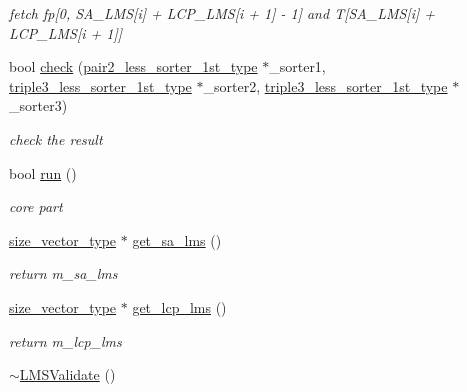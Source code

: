 \begin{DoxyCompactItemize}
\begin{DoxyCompactList}\small\item\em fetch fp\mbox{[}0, S\+A\+\_\+\+L\+MS\mbox{[}i\mbox{]} + L\+C\+P\+\_\+\+L\+MS\mbox{[}i + 1\mbox{]} -\/ 1\mbox{]} and T\mbox{[}S\+A\+\_\+\+L\+MS\mbox{[}i\mbox{]} + L\+C\+P\+\_\+\+L\+MS\mbox{[}i + 1\mbox{]}\mbox{]} \end{DoxyCompactList}\item 
bool \hyperlink{struct_validate4_1_1_l_m_s_validate_a906ef49f72b8a2baa0d7a2d196c4b62e}{check} (\hyperlink{class_validate4_ad945003027abfd152a0e177d7541580d}{pair2\+\_\+less\+\_\+sorter\+\_\+1st\+\_\+type} $\ast$\+\_\+sorter1, \hyperlink{class_validate4_ac2e4bde5df51eeff18ef5591d76e63dc}{triple3\+\_\+less\+\_\+sorter\+\_\+1st\+\_\+type} $\ast$\+\_\+sorter2, \hyperlink{class_validate4_ac2e4bde5df51eeff18ef5591d76e63dc}{triple3\+\_\+less\+\_\+sorter\+\_\+1st\+\_\+type} $\ast$\+\_\+sorter3)
\begin{DoxyCompactList}\small\item\em check the result \end{DoxyCompactList}\item 
bool \hyperlink{struct_validate4_1_1_l_m_s_validate_ae154c8745df4a743f7f13dfbb6e0dd95}{run} ()
\begin{DoxyCompactList}\small\item\em core part \end{DoxyCompactList}\item 
\hyperlink{class_validate4_a46ea31a0a4b23f583806792160421d15}{size\+\_\+vector\+\_\+type} $\ast$ \hyperlink{struct_validate4_1_1_l_m_s_validate_a31cdfa18f11ba39b3d9fbf08706913fc}{get\+\_\+sa\+\_\+lms} ()
\begin{DoxyCompactList}\small\item\em return m\+\_\+sa\+\_\+lms \end{DoxyCompactList}\item 
\hyperlink{class_validate4_a46ea31a0a4b23f583806792160421d15}{size\+\_\+vector\+\_\+type} $\ast$ \hyperlink{struct_validate4_1_1_l_m_s_validate_aee1c58f6d4c6e4cfb99bde60f6d05323}{get\+\_\+lcp\+\_\+lms} ()
\begin{DoxyCompactList}\small\item\em return m\+\_\+lcp\+\_\+lms \end{DoxyCompactList}\item 
\hyperlink{struct_validate4_1_1_l_m_s_validate_adaf3ee4e530f37787e9ff8c9f2ac511b}{$\sim$\+L\+M\+S\+Validate} ()
\end{DoxyCompactItemize}
